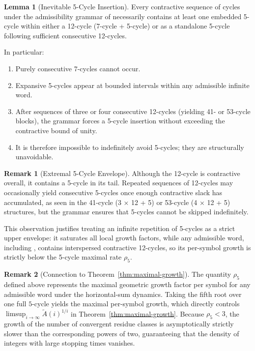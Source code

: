 \documentclass[12pt, oneside]{article}   	%
\numberwithin{equation}{section}          %
\theoremstyle{definition}
\newtheorem{lemma}[theorem]{Lemma}
\newtheorem*{remark}{Remark}
\begin{document}
\begin{lemma}[Inevitable 5-Cycle Insertion]
\label{lem:inevitable-5-cycle}
Every contractive sequence of cycles under the admissibility grammar of 
necessarily contains at least one embedded 5-cycle within either a 12-cycle (7-cycle + 5-cycle) 
or as a standalone 5-cycle following sufficient consecutive 12-cycles. 

\newpage
In particular:
\begin{enumerate}
    \item Purely consecutive 7-cycles cannot occur.
    \item Expansive 5-cycles appear at bounded intervals within any admissible infinite word.
    \item After sequences of three or four consecutive 12-cycles (yielding 41- or 53-cycle blocks),
          the grammar forces a 5-cycle insertion without exceeding the contractive bound of unity.
    \item It is therefore impossible to indefinitely avoid 5-cycles; they are structurally unavoidable.
\end{enumerate}
\end{lemma}

\begin{remark}[Extremal 5-Cycle Envelope]
Although the 12-cycle is contractive overall, it contains a 5-cycle in its tail. 
Repeated sequences of 12-cycles may occasionally yield consecutive 5-cycles once 
enough contractive slack has accumulated, as seen in the 41-cycle (3 × 12 + 5) 
or 53-cycle (4 × 12 + 5) structures, but the grammar ensures that 5-cycles 
cannot be skipped indefinitely. 

This observation justifies treating an infinite repetition of 5-cycles as a strict upper envelope: 
it saturates all local growth factors, while any admissible word, including , 
contains interspersed contractive 12-cycles, so its per-symbol growth is strictly below 
the 5-cycle maximal rate $\rho_5$.
\end{remark}

\begin{remark}[Connection to Theorem~\ref{thm:maximal-growth}]
The quantity \(\rho_5\) defined above represents the maximal geometric growth factor
per symbol for any admissible word under the horizontal-sum dynamics.  Taking the fifth
root over one full $5$-cycle yields the maximal per-symbol growth, which directly controls 
\(\limsup_{i\to\infty} \widetilde A(i)^{1/i}\) in Theorem~\ref{thm:maximal-growth}. 
Because \(\rho_5 < 3\), the growth of the number of convergent residue classes is
asymptotically strictly slower than the corresponding powers of two, guaranteeing
that the density of integers with large stopping times vanishes.
\end{remark}
\end{document}
